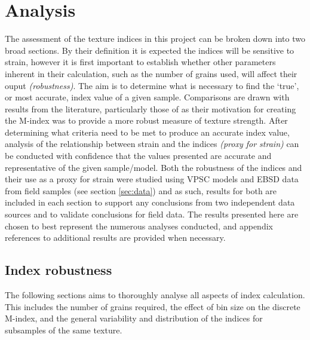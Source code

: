 \documentclass[a4paper,12pt]{report}
\numberwithin{equation}{chapter}
\begin{document}
\chapter{Analysis} \label{chap:analysis}
\vspace{-1cm}
The assessment of the texture indices in this project can be broken down into two broad sections. By their definition it is expected the indices will be sensitive to strain, however it is first important to establish whether other parameters inherent in their calculation, such as the number of grains used, will affect their ouput \emph{(robustness)}. The aim is to determine what is necessary to find the \lq{}true\rq{}, or most accurate, index value of a given sample. Comparisons are drawn with results from the literature, particularly those of \cite{Skemer} as their motivation for creating the M-index was to provide a more robust measure of texture strength. After determining what criteria need to be met to produce an accurate index value, analysis of the relationship between strain and the indices \emph{(proxy for strain)} can be conducted with confidence that the values presented are accurate and representative of the given sample/model. Both the robustness of the indices and their use as a proxy for strain were studied using VPSC models and EBSD data from field samples (see section \ref{sec:data}) and as such, results for both are included in each section to support any conclusions from two independent data sources and to validate conclusions for field data. The results presented here are chosen to best represent the numerous analyses conducted, and appendix references to additional results are provided when necessary.       


\section{Index robustness}
The following sections aims to thoroughly analyse all aspects of index calculation. This includes the number of grains required, the effect of bin size on the discrete M-index, and the general variability and distribution of the indices for subsamples of the same texture. 
\end{document}
